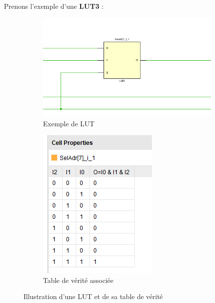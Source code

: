 Prenons l’exemple d’une \textbf{LUT3} :  

\begin{figure}[H]
    \centering
    \begin{subfigure}[b]{0.55\linewidth}
        \centering
        \includegraphics[width=\linewidth]{images/Routage/LUT_EXEMPLE.png}
        \caption{Exemple de LUT}
        \label{fig:lut_exemple}
    \end{subfigure}
    \hfill
    \begin{subfigure}[b]{0.25\linewidth}
        \centering
        \includegraphics[width=\linewidth]{images/Routage/TABLE_LUT.png}
        \caption{Table de vérité associée}
        \label{fig:table_lut}
    \end{subfigure}
    \caption{Illustration d’une LUT et de sa table de vérité}
    \label{fig:lut_complete}
\end{figure}

